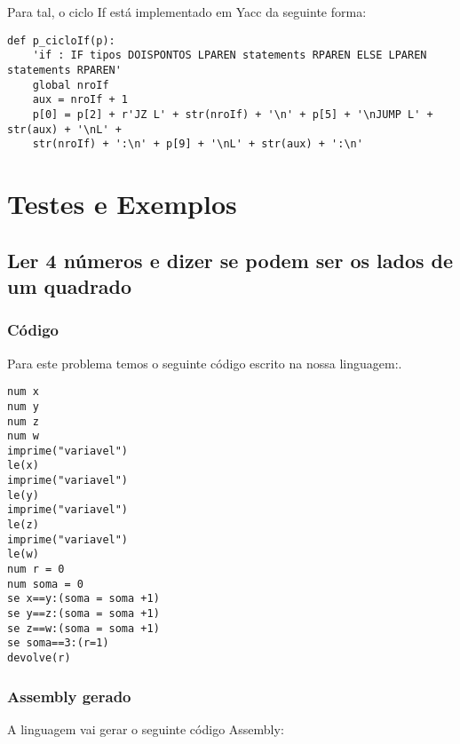 \documentclass[11pt,a4paper]{report}%
\begin{document}
Para tal, o ciclo If está implementado em Yacc da seguinte forma:

\begin{verbatim}
def p_cicloIf(p): 
    'if : IF tipos DOISPONTOS LPAREN statements RPAREN ELSE LPAREN statements RPAREN'
    global nroIf
    aux = nroIf + 1 
    p[0] = p[2] + r'JZ L' + str(nroIf) + '\n' + p[5] + '\nJUMP L' + str(aux) + '\nL' + 
    str(nroIf) + ':\n' + p[9] + '\nL' + str(aux) + ':\n'
\end{verbatim}

\chapter{Testes e Exemplos}

\section{Ler 4 números e dizer se podem ser os lados de um quadrado}

\subsection{Código}
Para este problema temos o seguinte código escrito na nossa linguagem:.
\\
\begin{lstlisting}[frame=single,numbers=none]
num x 
num y 
num z 
num w 
imprime("variavel")
le(x)
imprime("variavel")
le(y)
imprime("variavel")
le(z)
imprime("variavel")
le(w)
num r = 0
num soma = 0
se x==y:(soma = soma +1)
se y==z:(soma = soma +1)
se z==w:(soma = soma +1)
se soma==3:(r=1)
devolve(r)
\end{lstlisting}

\subsection{Assembly gerado}

A linguagem vai gerar o seguinte código Assembly:
\end{document}
